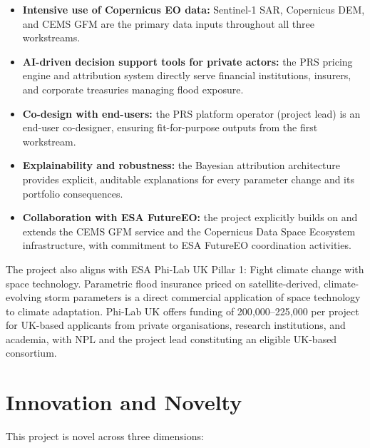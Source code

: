 \documentclass[11pt,a4paper]{article}
\begin{document}
\begin{itemize}
  \item \textbf{Intensive use of Copernicus EO data:} Sentinel-1 SAR, Copernicus
  DEM, and CEMS GFM are the primary data inputs throughout all three workstreams.
  \item \textbf{AI-driven decision support tools for private actors:} the PRS
  pricing engine and attribution system directly serve financial institutions,
  insurers, and corporate treasuries managing flood exposure.
  \item \textbf{Co-design with end-users:} the PRS platform operator (project lead)
  is an end-user co-designer, ensuring fit-for-purpose outputs from the first
  workstream.
  \item \textbf{Explainability and robustness:} the Bayesian attribution
  architecture provides explicit, auditable explanations for every parameter change
  and its portfolio consequences.
  \item \textbf{Collaboration with ESA FutureEO:} the project explicitly builds on
  and extends the CEMS GFM service and the Copernicus Data Space Ecosystem
  infrastructure, with commitment to ESA FutureEO coordination activities.
\end{itemize}

The project also aligns with ESA Phi-Lab UK Pillar 1: Fight climate change with
space technology. Parametric flood insurance priced on satellite-derived,
climate-evolving storm parameters is a direct commercial application of space
technology to climate adaptation. Phi-Lab UK offers funding of
\texteuro{}200{,}000--\texteuro{}225{,}000 per project for UK-based applicants from
private organisations, research institutions, and academia, with NPL and the
project lead constituting an eligible UK-based consortium.

\section{Innovation and Novelty}

This project is novel across three dimensions:
\end{document}
